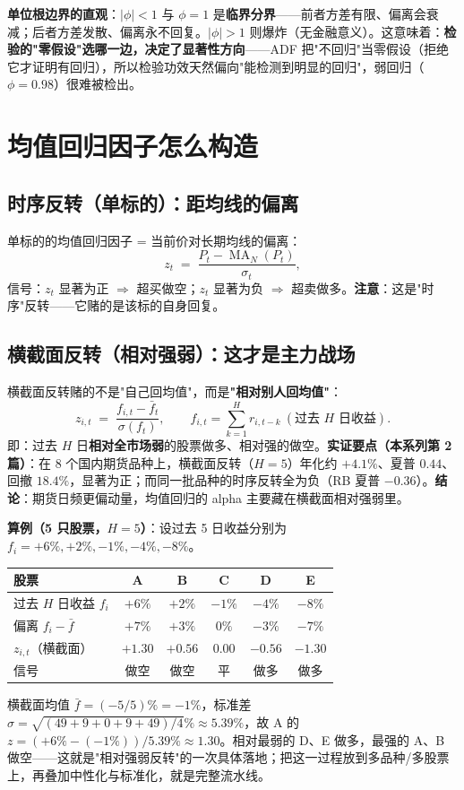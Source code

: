 \documentclass[UTF8,11pt]{ctexart}
\begin{document}
\textbf{单位根边界的直观}：$|\phi|<1$ 与 $\phi=1$ 是\textbf{临界分界}——前者方差有限、偏离会衰减；后者方差发散、偏离永不回复。$|\phi|>1$ 则爆炸（无金融意义）。这意味着：\textbf{检验的"零假设"选哪一边，决定了显著性方向}——ADF 把"不回归"当零假设（拒绝它才证明有回归），所以检验功效天然偏向"能检测到明显的回归"，弱回归（$\phi=0.98$）很难被检出。

\section{均值回归因子怎么构造}

\subsection{时序反转（单标的）：距均线的偏离}
单标的的均值回归因子 = 当前价对长期均线的偏离：
\begin{equation}
z_t \;=\; \frac{P_t - \operatorname{MA}_N(P_t)}{\sigma_t},
\end{equation}
信号：$z_t$ 显著为正 $\Rightarrow$ 超买做空；$z_t$ 显著为负 $\Rightarrow$ 超卖做多。\textbf{注意}：这是"时序"反转——它赌的是该标的自身回复。

\subsection{横截面反转（相对强弱）：这才是主力战场}
横截面反转赌的不是"自己回均值"，而是\textbf{"相对别人回均值"}：
\begin{equation}
z_{i,t} \;=\; \frac{f_{i,t} - \bar f_t}{\sigma(f_t)},
\qquad f_{i,t} = \sum_{k=1}^{H} r_{i,t-k}\ (\text{过去 }H\text{ 日收益}).
\end{equation}
即：过去 $H$ 日\textbf{相对全市场弱}的股票做多、相对强的做空。\textbf{实证要点（本系列第 2 篇）}：在 8 个国内期货品种上，横截面反转（$H=5$）年化约 $+4.1\%$、夏普 $0.44$、回撤 $18.4\%$，显著为正；而同一批品种的时序反转全为负（RB 夏普 $-0.36$）。\textbf{结论}：期货日频更偏动量，均值回归的 alpha 主要藏在横截面相对强弱里。

\textbf{算例（5 只股票，$H=5$）}：设过去 5 日收益分别为 $f_i = +6\%,+2\%,-1\%,-4\%,-8\%$。
\begin{center}
\renewcommand{\arraystretch}{1.3}
\begin{tabular}{@{}lccccc@{}}
\toprule
股票 & A & B & C & D & E \\
\midrule
过去 $H$ 日收益 $f_i$ & $+6\%$ & $+2\%$ & $-1\%$ & $-4\%$ & $-8\%$ \\
偏离 $f_i-\bar f$ & $+7\%$ & $+3\%$ & $0\%$ & $-3\%$ & $-7\%$ \\
$z_{i,t}$（横截面） & $+1.30$ & $+0.56$ & $0.00$ & $-0.56$ & $-1.30$ \\
信号 & 做空 & 做空 & 平 & 做多 & 做多 \\
\bottomrule
\end{tabular}
\end{center}
横截面均值 $\bar f=(-5/5)\%=-1\%$，标准差 $\sigma=\sqrt{(49+9+0+9+49)/4}\%\approx5.39\%$，故 A 的 $z=(+6\%-(-1\%))/5.39\%\approx1.30$。相对最弱的 D、E 做多，最强的 A、B 做空——这就是"相对强弱反转"的一次具体落地；把这一过程放到多品种/多股票上，再叠加中性化与标准化，就是完整流水线。
\end{document}
